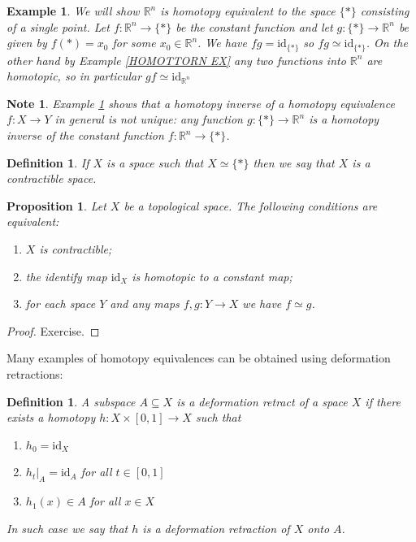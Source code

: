 \documentclass[11pt, letterpaper, oneside]{report}
\theoremstyle{pplain}
\newtheorem{proposition}[theorem]{Proposition}
\theoremstyle{ddefinition}
\newtheorem{definition}[theorem]{Definition}
\newtheorem{example}[theorem]{Example}
\newtheorem{note}[theorem]{Note}
\theoremstyle{nnn}
\theoremstyle{eexercise}
\newcommand{\R}{{\mathbb R}}
\newcommand{\id}{\mathrm{id}}
\newcommand{\benu}{\begin{enumerate}}
\newcommand{\eenu}{\end{enumerate}}
\begin{document}
\begin{example}
\label{RN CONTRACTIBLE EX}
We will show $\R^{n}$ is homotopy equivalent to the space $\{\ast\}$ consisting of a single point. 
Let $f\colon \R^{n} \to \{\ast\}$ be the constant function and let $g\colon \{\ast\} \to \R^{n}$ be given by 
$f(\ast) = x_{0}$ for some $x_{0}\in \R^{n}$. We have $fg = \id_{\{\ast\}}$ so $fg\simeq \id_{\{\ast\}}$. 
On the other hand by Example \ref{HOMOTTORN EX} any two functions into $\R^{n}$ are homotopic, 
so in particular $gf \simeq \id_{\R^{n}}$
\end{example}

\begin{note}
Example \ref{RN CONTRACTIBLE EX} shows that a homotopy inverse of a homotopy equivalence 
$f\colon X \to Y$ in general is not unique: any function $g\colon \{\ast\} \to \R^{n}$ is a homotopy 
inverse of the constant function $f\colon \R^{n} \to \{\ast\}$. 
\end{note}

\begin{definition}
If $X$ is a space such that $X \simeq \{\ast\}$ then we say that $X$ is a \emph{contractible space}. 
\end{definition}

\begin{proposition}
\label{CONTRACTIBLE COND PROP}
Let $X$ be a topological space. The following conditions are equivalent:
\benu
\item[1)] $X$ is contractible; 
\item[2)] the identify map $\id_{X}$ is homotopic to a constant map; 
\item[3)] for each  space $Y$ and any maps $f, g\colon Y \to X$ we have $f\simeq g$. 
\eenu
\end{proposition}

\begin{proof}
Exercise. 
\end{proof}

Many examples of homotopy equivalences can be  obtained  using deformation retractions:

\begin{definition}
A subspace $A \subseteq X$ is a \emph{deformation retract} of a space $X$ if there exists a homotopy 
$h\colon X \times [0, 1] \to X$ such that 
\benu
\item[1)] $h_{0} = \id_{X}$
\item[2)] $h_{t}|_{A} = \id_{A}$ for all  $t\in [0, 1]$ 
\item[3)] $h_{1}(x)\in A$ for all $x\in X$
\eenu
In such case we say that $h$ is a \emph{deformation retraction}
of $X$ onto $A$. 

\end{definition}  
\end{document}
